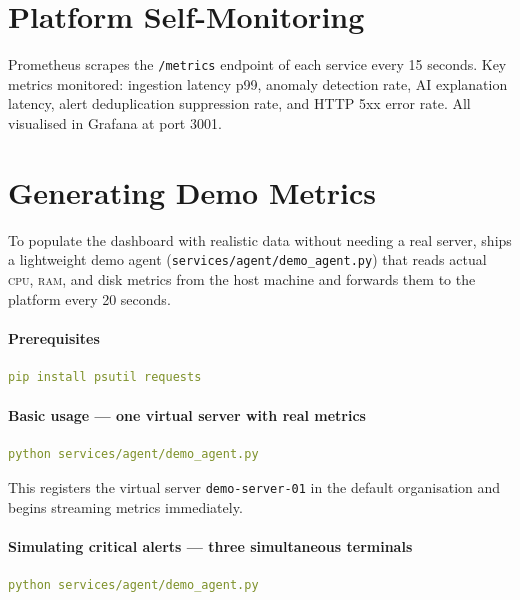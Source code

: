 \section{Platform Self-Monitoring}

Prometheus scrapes the \texttt{/metrics} endpoint of each service every 15 seconds.
Key metrics monitored: ingestion latency p99, anomaly detection rate,
AI explanation latency, alert deduplication suppression rate, and HTTP 5xx error rate.
All visualised in Grafana at port 3001.

\section{Generating Demo Metrics}

To populate the dashboard with realistic data without needing a real server,
\caimp{} ships a lightweight demo agent (\texttt{services/agent/demo\_agent.py})
that reads actual \textsc{cpu}, \textsc{ram}, and disk metrics from the host
machine and forwards them to the platform every 20 seconds.

\paragraph{Prerequisites}
\begin{lstlisting}[language=YAML]
pip install psutil requests
\end{lstlisting}

\paragraph{Basic usage — one virtual server with real metrics}
\begin{lstlisting}[language=YAML]
python services/agent/demo_agent.py
\end{lstlisting}

\noindent This registers the virtual server \texttt{demo-server-01} in the
default organisation and begins streaming metrics immediately.

\paragraph{Simulating critical alerts — three simultaneous terminals}

\begin{lstlisting}[language=YAML, caption={Terminal 1 — real machine metrics}]
python services/agent/demo_agent.py
\end{lstlisting}

